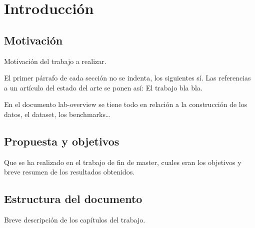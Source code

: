 
\chapter{Introducción}
\label{ch:Introduccion}

\section{Motivación}
\label{sec:Motivacion}

\noindent Motivación del trabajo a realizar.

El primer párrafo de cada sección no se indenta, los siguientes sí.
Las referencias a un artículo del estado del arte se ponen así: El trabajo \cite{Agirre2009} bla bla.

En el documento lab-overview se tiene todo en relación a la construcción de los datos, el dataset, los benchmarks\dots

\section{Propuesta y objetivos}
\label{sec:PropuestaYObjetivos}

\noindent Que se ha realizado en el trabajo de fin de master, cuales eran los objetivos y breve resumen de los resultados obtenidos.

\section{Estructura del documento}
\label{sec:EstructuraDelDocumento}

\noindent Breve descripción de los capítulos del trabajo.

